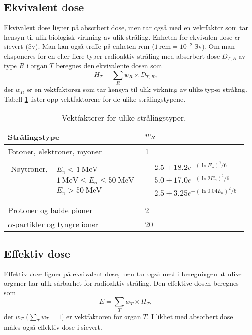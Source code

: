 \subsection{Ekvivalent dose}
Ekvivalent dose ligner på absorbert dose, men tar også med en vektfaktor som tar hensyn til ulik biologisk virkning av ulik stråling. Enheten for ekvivalen dose er sievert (Sv). Man kan også treffe på enheten rem ($1~\mathrm{rem} = 10^{-2}~\mathrm{Sv}$). Om man eksponeres for en eller flere typer radioaktiv stråling med absorbert dose $D_{T,R}$ av type $R$ i organ $T$ beregnes den ekvivalente dosen som
\begin{equation}
	H_T = \sum_R w_R\times D_{T,R},
\end{equation}
der $w_R$ er en vektfaktoren som tar hensyn til ulik virkning av ulike typer stråling. Tabell \ref{tab:radioaktiv:wR} lister opp vektfaktorene for de ulike strålingstypene.
\begin{table}
\begin{center}
	\begin{tabular}{ll}
	\hline
	\hline
	Strålingstype & $w_R$ \\
	\hline
	Fotoner, elektroner, myoner & 1 \\
	$\begin{aligned}
		\text{Nøytroner, } &E_n < 1~\mathrm{MeV} \\
		&1~\mathrm{MeV}\leq E_n \leq 50~\mathrm{MeV} \\
		&E_n > 50~\mathrm{MeV}
	\end{aligned}$& 
	$\begin{aligned}
		&2.5 + 18.2e^{-(\ln E_n)^2/6} \\
		&5.0 + 17.0e^{-(\ln 2E_n)^2/6} \\
		&2.5 + 3.25e^{-(\ln 0.04E_n)^2/6} \\
	\end{aligned}$\\
	Protoner og ladde pioner & 2 \\
	$\alpha$-partikler og tyngre ioner & 20 \\
	\hline
	\hline
	\end{tabular}
\end{center}
\caption{Vektfaktorer for ulike strålingstyper.}
\label{tab:radioaktiv:wR}
\end{table}

\subsection{Effektiv dose}
Effektiv dose ligner på ekvivalent dose, men tar også med i beregningen at ulike organer har ulik sårbarhet for radioaktiv stråling. Den effektive dosen beregnes som
\begin{equation}
	E = \sum_T w_T\times H_T,
\end{equation}
der $w_T$ ($\sum_T w_T = 1$) er vektfaktoren for organ $T$. I likhet med absorbert dose måles også effektiv dose i sievert.